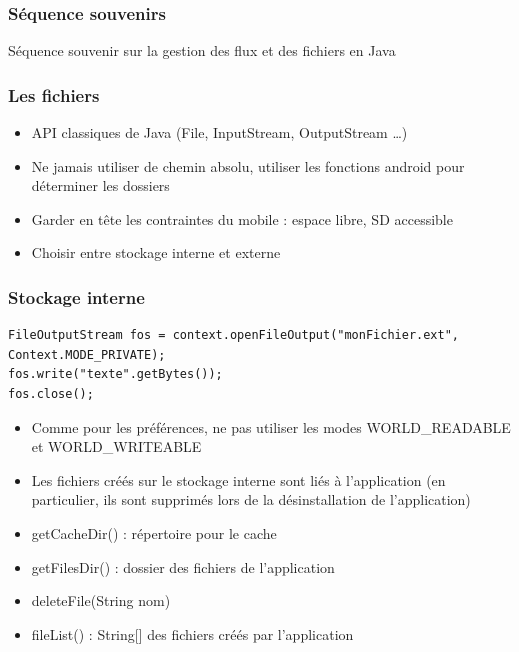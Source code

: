 \documentclass{beamer}
\begin{document}
\begin{frame}[fragile]
\frametitle{Séquence souvenirs}
Séquence souvenir sur la gestion des flux et des fichiers en Java
\end{frame}
\begin{frame}[fragile]
\frametitle{Les fichiers}
\begin{itemize}
    \item API classiques de Java (File, InputStream, OutputStream \ldots)
    \item Ne jamais utiliser de chemin absolu, utiliser les fonctions android pour déterminer les dossiers
    \item Garder en tête les contraintes du mobile : espace libre, SD accessible
    \item Choisir entre stockage interne et externe
\end{itemize}
\end{frame}
\begin{frame}[fragile]
\frametitle{Stockage interne}
\begin{lstlisting}
FileOutputStream fos = context.openFileOutput("monFichier.ext", Context.MODE_PRIVATE);
fos.write("texte".getBytes());
fos.close();
\end{lstlisting}
\begin{itemize}
    \item Comme pour les préférences, ne pas utiliser les modes WORLD\_READABLE et WORLD\_WRITEABLE
    \item Les fichiers créés sur le stockage interne sont liés à l'application
    (en particulier, ils sont supprimés lors de la désinstallation de l'application)
\end{itemize}
\begin{itemize}
    \item getCacheDir() : répertoire pour le cache
    \item getFilesDir() : dossier des fichiers de l'application
    \item deleteFile(String nom)
    \item fileList() : String[] des fichiers créés par l'application
\end{itemize}
\end{frame}
\end{document}
